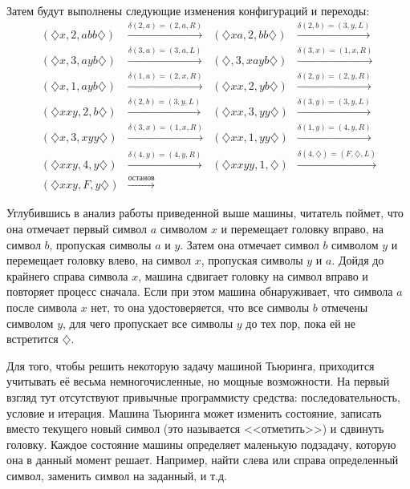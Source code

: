 Затем будут выполнены следующие изменения конфигураций и переходы:
\[
    \begin{array}{llll}
        (\diamondsuit x,2,abb\diamondsuit)
            &\xrightarrow{\delta(2,a)=(2,a,R)}
                &(\diamondsuit xa,2,bb\diamondsuit)
                    &\xrightarrow{\delta(2,b)=(3,y,L)}\\
        (\diamondsuit x,3,ayb\diamondsuit)
            &\xrightarrow{\delta(3,a)=(3,a,L)}
                &(\diamondsuit,3,xayb\diamondsuit)
                    &\xrightarrow{\delta(3,x)=(1,x,R)}\\
        (\diamondsuit x,1,ayb\diamondsuit)
            &\xrightarrow{\delta(1,a)=(2,x,R)}
                &(\diamondsuit xx,2,yb\diamondsuit)
                    &\xrightarrow{\delta(2,y)=(2,y,R)}\\
        (\diamondsuit xxy,2,b\diamondsuit)
            &\xrightarrow{\delta(2,b)=(3,y,L)}
                &(\diamondsuit xx,3,yy\diamondsuit)
                    &\xrightarrow{\delta(3,y)=(3,y,L)}\\
        (\diamondsuit x,3,xyy\diamondsuit)
            &\xrightarrow{\delta(3,x)=(1,x,R)}
                &(\diamondsuit xx,1,yy\diamondsuit)
                    &\xrightarrow{\delta(1,y)=(4,y,R)}\\
        (\diamondsuit xxy,4,y\diamondsuit)
            &\xrightarrow{\delta(4,y)=(4,y,R)}
                &(\diamondsuit xxyy,1,\diamondsuit)
                    &\xrightarrow{\delta(4,\diamondsuit)=(F,\diamondsuit,L)}\\
        (\diamondsuit xxy,F,y\diamondsuit)
            &\xrightarrow{\text{останов}}
                &
                    &
    \end{array}
\]

Углубившись в анализ работы приведенной выше машины, читатель поймет, что она отмечает первый символ $a$ символом $x$ и перемещает головку вправо, на символ $b$, пропуская символы $a$ и $y$. Затем она отмечает символ $b$ символом $y$ и перемещает головку влево, на символ $x$, пропуская символы $y$ и $a$. Дойдя до крайнего справа символа $x$, машина сдвигает головку на символ вправо и повторяет процесс сначала. Если при этом машина обнаруживает, что символа $a$ после символа  $x$ нет, то она удостоверяется, что все символы $b$ отмечены символом $y$, для чего пропускает все символы $y$ до тех пор, пока ей не встретится $\diamondsuit$.

Для того, чтобы решить некоторую задачу машиной Тьюринга, приходится учитывать её весьма немногочисленные, но мощные возможности. На первый взгляд тут отсутствуют привычные программисту средства: последовательность,  условие и итерация. Машина Тьюринга может изменить состояние, записать вместо текущего новый символ (это называется <<отметить>>) и сдвинуть головку. Каждое состояние машины определяет маленькую подзадачу, которую она в данный момент решает. Например, найти слева или справа определенный символ, заменить символ на заданный, и т.д.

